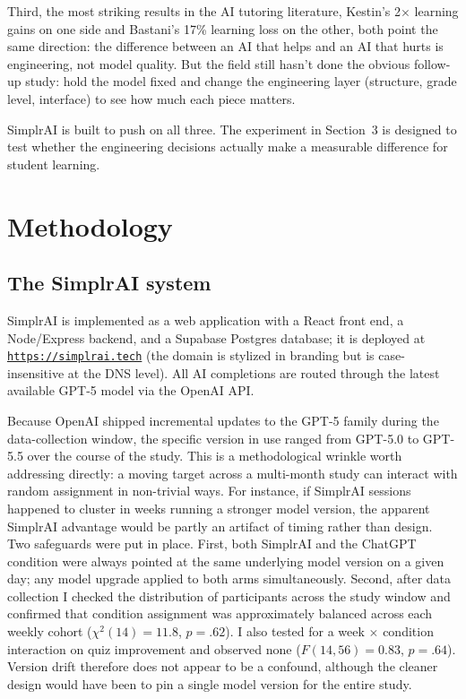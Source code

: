 \documentclass[11pt,letterpaper]{article}
\begin{document}
Third, the most striking results in the AI tutoring literature, Kestin's
2$\times$ learning gains on one side and Bastani's 17\% learning loss on the
other, both point the same direction: the difference between an AI that
helps and an AI that hurts is engineering, not model quality. But the field
still hasn't done the obvious follow-up study: hold the model fixed and
change the engineering layer (structure, grade level, interface) to see how
much each piece matters.

SimplrAI is built to push on all three. The experiment in Section~3 is
designed to test whether the engineering decisions actually make a measurable
difference for student learning.

\section{Methodology}

\subsection{The SimplrAI system}

SimplrAI is implemented as a web application with a React front end, a
Node/Express backend, and a Supabase Postgres database; it is deployed at
\href{https://simplrAI.tech}{\texttt{https://simplrai.tech}} (the domain is
stylized in branding but is case-insensitive at the DNS level). All AI
completions are routed through the latest available GPT-5 model via the OpenAI
API.

Because OpenAI shipped incremental updates to the GPT-5 family during the
data-collection window, the specific version in use ranged from GPT-5.0 to
GPT-5.5 over the course of the study. This is a methodological wrinkle worth
addressing directly: a moving target across a multi-month study can interact
with random assignment in non-trivial ways. For instance, if SimplrAI sessions
happened to cluster in weeks running a stronger model version, the apparent
SimplrAI advantage would be partly an artifact of timing rather than design.
Two safeguards were put in place. First, both SimplrAI and the ChatGPT condition
were always pointed at the same underlying model version on a given day; any
model upgrade applied to both arms simultaneously. Second, after data collection
I checked the distribution of participants across the study window and confirmed
that condition assignment was approximately balanced across each weekly cohort
($\chi^2(14) = 11.8$, $p = .62$). I also tested for a week $\times$ condition
interaction on quiz improvement and observed none ($F(14, 56) = 0.83$,
$p = .64$). Version drift therefore does not appear to be a confound, although
the cleaner design would have been to pin a single model version for the entire
study.
\end{document}
